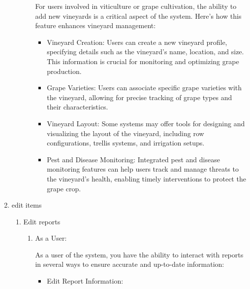 \begin{enumerate}
\begin{itemize}
\begin{enumerate}
                              For users involved in viticulture or grape cultivation, the ability to add new vineyards is a critical aspect of the system. Here's how this feature enhances vineyard management:

                              \begin{itemize}
                                  \item Vineyard Creation: Users can create a new vineyard profile, specifying details such as the vineyard's name, location, and size. This information is crucial for monitoring and optimizing grape production.

                                  \item Grape Varieties: Users can associate specific grape varieties with the vineyard, allowing for precise tracking of grape types and their characteristics.

                                  \item Vineyard Layout: Some systems may offer tools for designing and visualizing the layout of the vineyard, including row configurations, trellis systems, and irrigation setups.

                                  \item Pest and Disease Monitoring: Integrated pest and disease monitoring features can help users track and manage threats to the vineyard's health, enabling timely interventions to protect the grape crop.
                              \end{itemize}
                    \end{enumerate}
          \end{itemize}
      \item  edit items      
          \begin{enumerate}
              \item Edit reports
                    \begin{enumerate}

                        \item  As a User:

                              As a user of the system, you have the ability to interact with reports in several ways to ensure accurate and up-to-date information:
                              \begin{itemize}

                                  \item Edit Report Information:


\end{itemize}
\end{enumerate}
\end{enumerate}
\end{enumerate}

